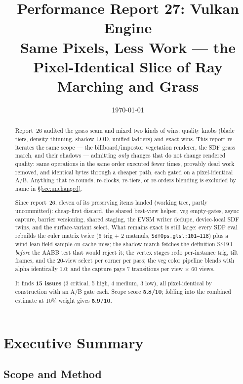 \documentclass[11pt,a4paper]{article}
\title{Performance Report 27: Vulkan Engine \\
\large Same Pixels, Less Work --- the Pixel-Identical Slice of Ray Marching and Grass}
\author{}
\date{\today}
\begin{document}
\maketitle

\begin{abstract}
Report~26 audited the grass seam and mixed two kinds of wins: quality knobs
(blade tiers, density thinning, shadow LOD, unified ladders) and exact wins.
This report re-iterates the same scope --- the billboard/impostor vegetation
renderer, the SDF grass march, and their shadows --- admitting \emph{only}
changes that do not change rendered quality: same operations in the same
order executed fewer times, provably dead work removed, and identical bytes
through a cheaper path, each gated on a pixel-identical A/B. Anything that
re-rounds, re-clocks, re-tiers, or re-orders blending is excluded by name in
\S\ref{sec:unchanged}.

Since report~26, eleven of its preserving items landed (working tree,
partly uncommitted): cheap-first discard, the shared best-view helper,
veg empty-gates, async capture, barrier versioning, shared staging, the
EVSM writer dedupe, device-local SDF twins, and the surface-variant select.
What remains exact is still large: every SDF eval rebuilds the euler matrix
twice (6 trig + 2 matmuls, \texttt{SdfOps.glsl:101--118}) plus a wind-lean
field sample on cache miss; the shadow march fetches the definition SSBO
\emph{before} the AABB test that would reject it; the vertex stages redo
per-instance trig, tilt frames, and the 20-view select per corner per pass;
the veg color pipeline blends with alpha identically 1.0; and the capture
pays 7 transitions per view $\times$ 60 views.

It finds \textbf{15 issues} (3 critical, 5 high, 4 medium, 3 low), all
pixel-identical by construction with an A/B gate each. Scope score
\textbf{5.8/10}; folding into the combined estimate at 10\% weight gives
\textbf{5.9/10}.
\end{abstract}

\tableofcontents
\newpage

\section{Executive Summary}

\subsection{Scope and Method}
\end{document}
